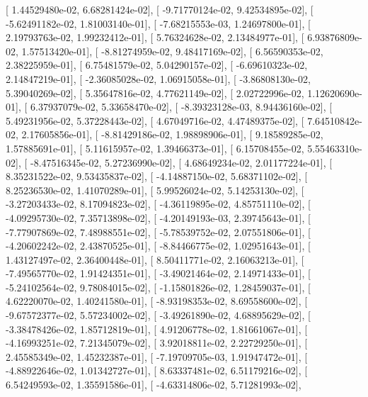 \documentclass{article}
\begin{document}
       [  1.44529480e-02,   6.68281424e-02],
       [ -9.71770124e-02,   9.42534895e-02],
       [ -5.62491182e-02,   1.81003140e-01],
       [ -7.68215553e-03,   1.24697800e-01],
       [  2.19793763e-02,   1.99232412e-01],
       [  5.76324628e-02,   2.13484977e-01],
       [  6.93876809e-02,   1.57513420e-01],
       [ -8.81274959e-02,   9.48417169e-02],
       [  6.56590353e-02,   2.38225959e-01],
       [  6.75481579e-02,   5.04290157e-02],
       [ -6.69610323e-02,   2.14847219e-01],
       [ -2.36085028e-02,   1.06915058e-01],
       [ -3.86808130e-02,   5.39040269e-02],
       [  5.35647816e-02,   4.77621149e-02],
       [  2.02722996e-02,   1.12620690e-01],
       [  6.37937079e-02,   5.33658470e-02],
       [ -8.39323128e-03,   8.94436160e-02],
       [  5.49231956e-02,   5.37228443e-02],
       [  4.67049716e-02,   4.47489375e-02],
       [  7.64510842e-02,   2.17605856e-01],
       [ -8.81429186e-02,   1.98898906e-01],
       [  9.18589285e-02,   1.57885691e-01],
       [  5.11615957e-02,   1.39466373e-01],
       [  6.15708455e-02,   5.55463310e-02],
       [ -8.47516345e-02,   5.27236990e-02],
       [  4.68649234e-02,   2.01177224e-01],
       [  8.35231522e-02,   9.53435837e-02],
       [ -4.14887150e-02,   5.68371102e-02],
       [  8.25236530e-02,   1.41070289e-01],
       [  5.99526024e-02,   5.14253130e-02],
       [ -3.27203433e-02,   8.17094823e-02],
       [ -4.36119895e-02,   4.85751110e-02],
       [ -4.09295730e-02,   7.35713898e-02],
       [ -4.20149193e-03,   2.39745643e-01],
       [ -7.77907869e-02,   7.48988551e-02],
       [ -5.78539752e-02,   2.07551806e-01],
       [ -4.20602242e-02,   2.43870525e-01],
       [ -8.84466775e-02,   1.02951643e-01],
       [  1.43127497e-02,   2.36400448e-01],
       [  8.50411771e-02,   2.16063213e-01],
       [ -7.49565770e-02,   1.91424351e-01],
       [ -3.49021464e-02,   2.14971433e-01],
       [ -5.24102564e-02,   9.78084015e-02],
       [ -1.15801826e-02,   1.28459037e-01],
       [  4.62220070e-02,   1.40241580e-01],
       [ -8.93198353e-02,   8.69558600e-02],
       [ -9.67572377e-02,   5.57234002e-02],
       [ -3.49261890e-02,   4.68895629e-02],
       [ -3.38478426e-02,   1.85712819e-01],
       [  4.91206778e-02,   1.81661067e-01],
       [ -4.16993251e-02,   7.21345079e-02],
       [  3.92018811e-02,   2.22729250e-01],
       [  2.45585349e-02,   1.45232387e-01],
       [ -7.19709705e-03,   1.91947472e-01],
       [ -4.88922646e-02,   1.01342727e-01],
       [  8.63337481e-02,   6.51179216e-02],
       [  6.54249593e-02,   1.35591586e-01],
       [ -4.63314806e-02,   5.71281993e-02],
\end{document}
